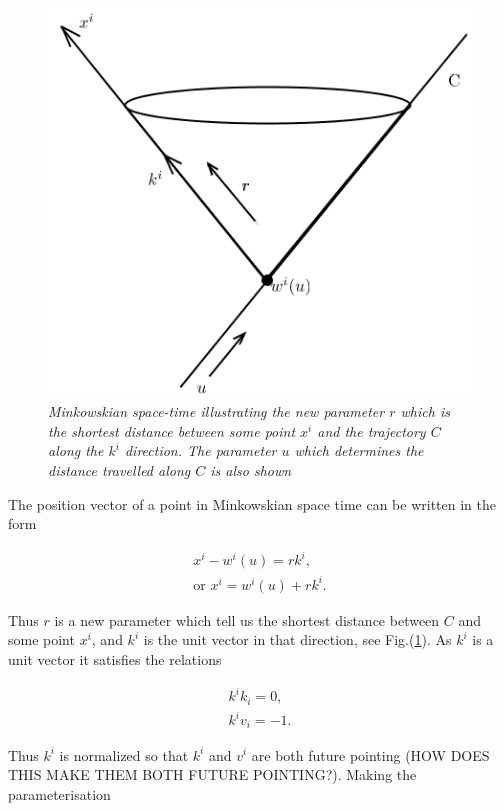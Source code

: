 \begin{figure}[h!]
\begin{center}
\caption{\textit{Minkowskian space-time illustrating the new parameter $r$ which is the shortest distance between some point $x^i$ and the trajectory $C$ along the $k^i$ direction. The parameter $u$ which determines the distance travelled along $C$ is also shown}}
\label{Reparameterization_Figure_Unit_Vector}
\includegraphics[scale=0.8]{figs/2_1.png}
\end{center}
\end{figure}

The position vector of a point in Minkowskian space time can be written in the form

\begin{eqnarray*}
x^i - w^i (u) = r k^i, \\
\text{or } x^i = w^i(u) + r k^i. 
\end{eqnarray*}

\noindent Thus $r$ is a new parameter which tell us the shortest distance between $C$ and some point $x^i$, and $k^i$ is the unit vector in that direction, see Fig.(\ref{Reparameterization_Figure_Unit_Vector}). As $k^i$ is a unit vector it satisfies the relations

\begin{gather}
k^i k_i = 0 \label{k_rel_1},\\
k^i v_i = -1 \label{k_rel_2}.
\end{gather}

\noindent Thus $k^i$ is normalized so that $k^i$ and $v^i$ are both future pointing (HOW DOES THIS MAKE THEM BOTH FUTURE POINTING?). Making the parameterisation

